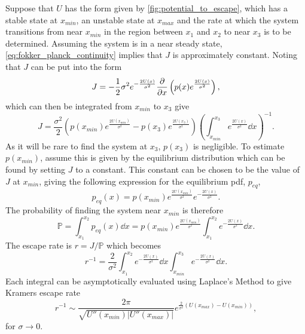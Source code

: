 Suppose that $U$ has the form given by \cref{fig:potential_to_escape}, which has a stable state at $x_{min}$, an unstable state at $x_{max}$ and the rate at which the system
transitions from near $x_{min}$ in the region between $x_1$ and $x_2$ to near $x_3$ is to be determined. Assuming the system is in a near steady state, \cref{eq:fokker_planck_continuity}
implies that $J$ is approximately constant. Noting that $J$ can be put into the form
\begin{equation}
  \label{eq:probability_current_other_form}
  J = -\frac{1}{2}\sigma^2 e^{-\frac{2U(x)}{\sigma^2}} \pdv{x} \left( p(x) e^{\frac{2U(x)}{\sigma^2}}\right),
\end{equation}
which can then be integrated from $x_{min}$ to $x_3$ give
\begin{equation}
  \label{eq:integrated_J}
  J = \frac{\sigma^2}{2} \left(p(x_{min})e^{\frac{2U(x_{min})}{\sigma^2}} - p(x_3)e^{\frac{2U(x_{3})}{\sigma^2}}\right)\left(\int_{x_{min}}^{x_{3}} e^{\frac{2U(x)}{\sigma^2}} \dd{x}\right)^{-1}.
\end{equation}
As it will be rare to find the system at $x_3$, $p(x_3)$ is negligible. To estimate $p(x_{min})$, assume this is given by the equilibrium distribution which can be found by setting $J$ to
a constant. This constant can be chosen to be the value of $J$ at $x_{min}$, giving the following expression for the equilibrium pdf, $p_{eq}$,
\begin{equation}
  \label{eq:equilibrium_pdf}
  p_{eq}(x) = p(x_{min})e^{\frac{2U(x_{min})}{\sigma^2}}e^{-\frac{2U(x)}{\sigma^2}}.
\end{equation}
The probability of finding the system near $x_{min}$ is therefore
\begin{equation}
  \label{eq:p_near_xmin}
  \mathbb{P} = \int_{x_1}^{x_2} p_{eq}(x) \dd{x} = p(x_{min})e^{\frac{2U(x_{min})}{\sigma^2}} \int_{x_1}^{x_2} e^{-\frac{2U(x)}{\sigma^2}} \dd{x}.
\end{equation}
The escape rate is $r = J/\mathbb{P}$ which becomes
\begin{equation}
  \label{eq:escape_rate_integrals}
  r^{-1} = \frac{2}{\sigma^2} \int_{x_1}^{x_2} e^{-\frac{2U(x)}{\sigma^2}} \dd{x} \int_{x_{min}}^{x_3} e^{-\frac{2U(x)}{\sigma^2}} \dd{x}.
\end{equation}
Each integral can be asymptotically evaluated using Laplace's Method \parencite{Bender1978} to give Kramers escape rate
\begin{equation}
  \label{eq:kramers}
  r^{-1} \sim \frac{2\pi}{\sqrt{U''(x_{min})|U''(x_{max})|}} e^{\frac{2}{\sigma^2}\left(U(x_{max})-U(x_{min})\right)},
\end{equation}
for $ \sigma \rightarrow 0$.

